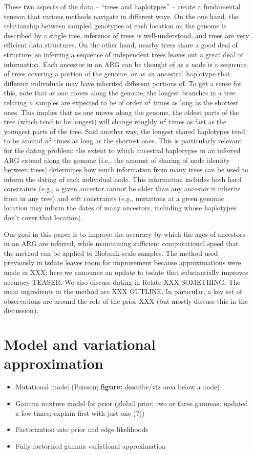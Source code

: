 \documentclass{article}
\begin{document}
These two aspects of the data -- ``trees and haplotypes'' --
create a fundamental tension that various methods navigate in different ways.
On the one hand, the relationship between sampled genotypes at each location on the genome is described by a single tree,
inference of trees is well-understood, and trees are very efficient data structures.
On the other hand, nearby trees share a good deal of structure,
so inferring a sequence of independent trees leaves out a great deal of information.
Each ancestor in an ARG can be thought of as a node is a sequence of trees covering a portion of the genome,
or as an ancestral haplotype that different individuals may have inherited different portions of.
To get a sense for this, note that as one moves along the genome, the longest branches in a tree relating $n$ samples
are expected to be of order $n^2$ times as long as the shortest ones.
This implies that as one moves along the genome,
the oldest parts of the tree (which tend to be longest) will change roughly $n^2$ times as fast as the youngest parts of the tree.
Said another way, the longest shared haplotypes tend to be around $n^2$ times as long as the shortest ones.
This is particularly relevant for the dating problem:
the extent to which ancestral haplotypes in an inferred ARG extend along the genome
(i.e., the amount of sharing of node identity between trees)
determines how much information from many trees can be used to inform the dating of each individual node.
This information includes both hard constraints
(e.g., a given ancestor cannot be older than any ancestor it inherits from in any tree)
and soft constraints
(e.g., mutations at a given genomic location may inform the dates of many ancestors,
including whose haplotypes don't cover that location).

Our goal in this paper is to improve the accuracy by which the ages of ancestors in an ARG are inferred,
while maintaining sufficient computational speed that the method can be applied to Biobank-scale samples.
The method used previously in tsdate \citep{tsdate}
leaves room for improvement because approximations were made in XXX;
here we announce an update to tsdate that substantially improves accuracy TEASER.
We also discuss dating in Relate XXX SOMETHING.
The main ingredients in the method are XXX OUTLINE.
In particular, a key set of observations are around the role of the prior XXX (but mostly discuss this in the discussion).



\section{Model and variational approximation}
\begin{itemize}
\item Mutational model (Poisson; \textbf{figure:} describe/viz area below a node)
\item Gamma mixture model for prior (global prior; two or three gammas; updated a few times; explain first with just one (?))
\item Factorization into prior and edge likelihoods
\item Fully-factorized gamma variational approximation
\end{itemize}
\end{document}
